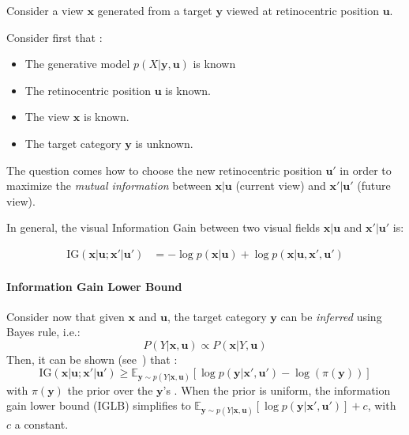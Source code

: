 Consider a view $\boldsymbol{x}$ generated from a target $\boldsymbol{y}$ viewed at retinocentric position $\boldsymbol{u}$.

Consider first that :
\begin{itemize}
	\item The generative model  $p(X|\boldsymbol{y}, \boldsymbol{u})$ is known
	\item The retinocentric position  $\boldsymbol{u}$ is known.
	\item The view $\boldsymbol{x}$ is known.
	\item The target category  $\boldsymbol{y}$ is unknown.
\end{itemize}



The question comes how to choose the new retinocentric position $\boldsymbol{u}'$ in order to maximize the \emph{mutual information} between $\boldsymbol{x}|\boldsymbol{u}$ (current view) and $\boldsymbol{x}'|\boldsymbol{u}'$ (future view).

In general, the visual Information Gain between two visual fields $\boldsymbol{x}|\boldsymbol{u}$  and $\boldsymbol{x}'|\boldsymbol{u}'$ is:

\begin{align*}
\text{IG}(\boldsymbol{x}|\boldsymbol{u}; \boldsymbol{x}'| \boldsymbol{u}')
&= -\log p(\boldsymbol{x}|\boldsymbol{u})
+ \log p(\boldsymbol{x}|\boldsymbol{u}, \boldsymbol{x}', \boldsymbol{u}')
\end{align*}

\paragraph{Information Gain Lower Bound}
Consider now that given  $\boldsymbol{x}$ and $\boldsymbol{u}$, the target category  $\boldsymbol{y}$ can be \emph{inferred} using Bayes rule, i.e.:
$$ P(Y|\boldsymbol{x}, \boldsymbol{u}) \propto  P(\boldsymbol{x}|Y, \boldsymbol{u}) $$
Then, it can be shown (see~\cite{Dauce18}) that :
$$\text{IG}(\boldsymbol{x}|\boldsymbol{u}; \boldsymbol{x}'| \boldsymbol{u}') \geq \mathbb{E}_{\boldsymbol{y}\sim p(Y|\boldsymbol{x}, \boldsymbol{u})} \left[\log p(\boldsymbol{y}|\boldsymbol{x}', \boldsymbol{u}') - \log(\pi(\boldsymbol{y})) \right]$$
with  $\pi(\boldsymbol{y})$ the prior over the $\boldsymbol{y}$'s .
When the prior is uniform, the information gain lower bound (IGLB) simplifies to $\mathbb{E}_{\boldsymbol{y}\sim p(Y|\boldsymbol{x}, \boldsymbol{u})} \left[\log p(\boldsymbol{y}|\boldsymbol{x}', \boldsymbol{u}')\right] + c$, with $c$ a constant.


